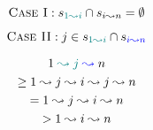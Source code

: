 \begin{frame}{}
  \[
    \textsc{Case I}: s_{\textcolor{teal}{1 \leadsto i}} \cap s_{i \leadsto n} = \emptyset
  \]

  \pause
\end{frame}

\begin{frame}{}
  \[
    \textsc{Case II}: j \in s_{\textcolor{teal}{1 \leadsto i}} \cap s_{\textcolor{blue}{i \leadsto n}}
  \]

  \begin{gather*}
    1 \;\textcolor{teal}{\leadsto j}\; \textcolor{blue}{\leadsto}\; n \\
    \ge 1 \leadsto j \leadsto i \leadsto j \leadsto n \\
    = 1 \leadsto j \leadsto i \leadsto n \\
    > 1 \leadsto i \leadsto n
  \end{gather*}
\end{frame}
